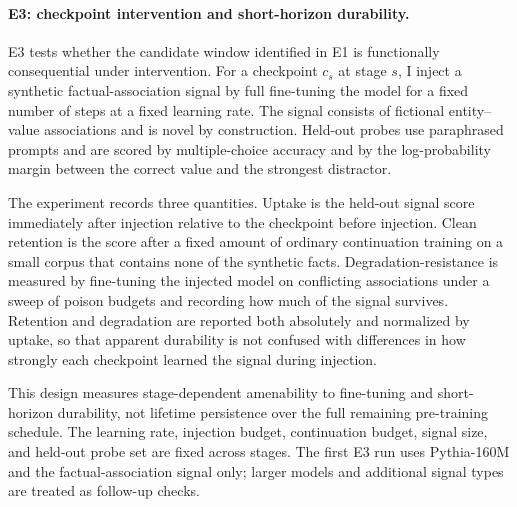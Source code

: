 \paragraph{E3: checkpoint intervention and short-horizon durability.}
E3 tests whether the candidate window identified in E1 is functionally consequential under
intervention. For a checkpoint $c_s$ at stage $s$, I inject a synthetic factual-association
signal by full fine-tuning the model for a fixed number of steps at a fixed learning rate. The
signal consists of fictional entity--value associations and is novel by construction. Held-out
probes use paraphrased prompts and are scored by multiple-choice accuracy and by the
log-probability margin between the correct value and the strongest distractor.

The experiment records three quantities. Uptake is the held-out signal score immediately after
injection relative to the checkpoint before injection. Clean retention is the score after a
fixed amount of ordinary continuation training on a small corpus that contains none of the
synthetic facts. Degradation-resistance is measured by fine-tuning the injected model on
conflicting associations under a sweep of poison budgets and recording how much of the signal
survives. Retention and degradation are reported both absolutely and normalized by uptake, so
that apparent durability is not confused with differences in how strongly each checkpoint
learned the signal during injection.

This design measures stage-dependent amenability to fine-tuning and short-horizon durability,
not lifetime persistence over the full remaining pre-training schedule. The learning rate,
injection budget, continuation budget, signal size, and held-out probe set are fixed across
stages. The first E3 run uses Pythia-160M and the factual-association signal only; larger
models and additional signal types are treated as follow-up checks.
